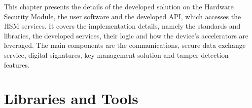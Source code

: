 \cleardoublepage
\label{chap:implementation}

This chapter presents the details of the developed solution on the Hardware Security Module, the user software and the developed API, which accesses the HSM services.
It covers the implementation details, namely the standards and libraries, the developed services, their logic and how the device's accelerators are leveraged. The main components are the communications, secure data exchange service, digital signatures, key management solution and tamper detection features.

\section{Libraries and Tools}\label{chap:implementation:tools}

